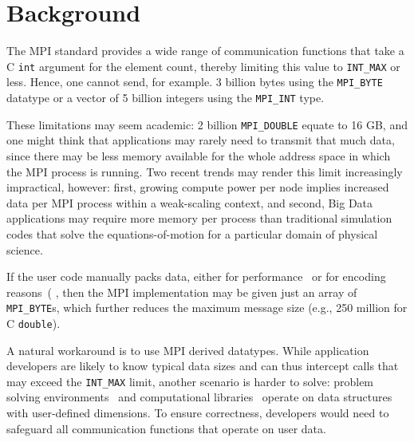 
\section{Background}

The MPI standard provides a wide range of communication functions that
take a C \texttt{int} argument for the element count, thereby limiting this
value to \texttt{INT\_MAX} or less.
Hence, one cannot send, for example. 3 billion bytes using the \texttt{MPI\_BYTE} 
datatype or a vector of 5 billion integers using the \texttt{MPI\_INT} type. 

These limitations may seem academic: 2 billion
\texttt{MPI\_DOUBLE} equate to 16 GB, and one might think that
applications may rarely need to transmit that much data, since there
may be less memory available for the whole address space in which the MPI
process is running.
Two recent trends may render this limit increasingly impractical, however: 
first, growing compute power per node implies increased data per MPI
process within a weak-scaling context, and second, 
Big Data applications may require more memory 
per process than traditional simulation codes that solve the 
equations-of-motion for a particular domain of physical science.

If the user code manually packs data, either for
performance~\cite{jenkins2012enabling} or for encoding
reasons~(\cite{boostmpi} \cite{li:PnetCDF},
 then the MPI implementation may be given just
an array of \texttt{MPI\_BYTE}s, which further reduces the maximum
message size (e.g., 250 million for C \texttt{double}).

A natural workaround is to use MPI derived datatypes. While 
application developers are likely to know typical data sizes and
can thus intercept calls that may exceed the \texttt{INT\_MAX} limit,
another scenario is harder to solve: problem solving
environments~\cite{cactus:SC01, gromacs} and computational
libraries~\cite{physis, libgeodecomp} operate on data structures with
user-defined dimensions. To ensure correctness, developers would need
to safeguard all communication functions that operate on user data.

%

